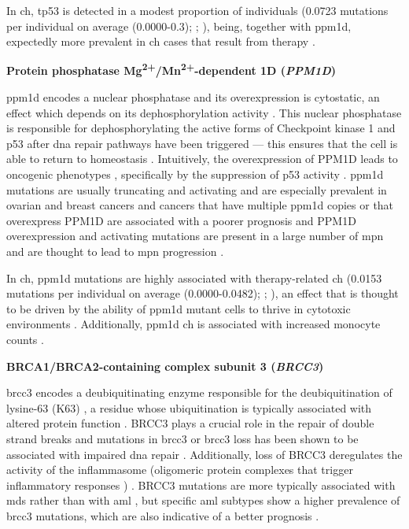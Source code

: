 In \ac{ch}, \ac{tp53} is detected in a modest proportion of individuals \cite{Jaiswal2014-rl,Genovese2014-eu,Zink2017-zi,Bolton2020-ct,Coombs2017-ph,McKerrell2015-rl,Acuna-Hidalgo2017-ng,Desai2018-pj,Young2016-du,Young2019-rz} (0.0723 mutations per individual on average (0.0000-0.3); ; ), being, together with \ac{ppm1d}, expectedly more prevalent in \ac{ch} cases that result from therapy \cite{Zehir2017-gh}.

\noindent \textbf{Protein phosphatase Mg\textsuperscript{2+}/Mn\textsuperscript{2+}-dependent 1D (\textit{PPM1D})}

\Ac{ppm1d} encodes a nuclear phosphatase and its overexpression is cytostatic, an effect which depends on its dephosphorylation activity \cite{Fiscella1997-ay}. This nuclear phosphatase is responsible for dephosphorylating the active forms of Checkpoint kinase 1 and p53 after \ac{dna} repair pathways have been triggered --- this ensures that the cell is able to return to homeostasis \cite{Lu2005-it}. Intuitively, the overexpression of PPM1D leads to oncogenic phenotypes \cite{Li2002-dl}, specifically by the suppression of p53 activity \cite{Bulavin2002-ft}. \ac{ppm1d} mutations are usually truncating and activating and are especially prevalent in ovarian and breast cancers \cite{Bolton2020-ct} and cancers that have multiple \ac{ppm1d} copies or that overexpress PPM1D are associated with a poorer prognosis \cite{Lambros2010-yo,Castellino2008-wr,Yang2015-kz} and PPM1D overexpression and activating mutations are present in a large number of \ac{mpn} and are thought to lead to \ac{mpn} progression \cite{Marcellino2019-ze}. 

In \ac{ch}, \ac{ppm1d} mutations are highly associated with therapy-related \ac{ch} \cite{Genovese2014-eu,Zink2017-zi,Bolton2020-ct,Coombs2017-ph,Desai2018-pj} (0.0153 mutations per individual on average (0.0000-0.0482); ; ), an effect that is thought to be driven by the ability of \ac{ppm1d} mutant cells to thrive in cytotoxic environments \cite{Hsu2018-ta}. Additionally, \ac{ppm1d} \ac{ch} is associated with increased monocyte counts \cite{Dawoud2020-af}.

\noindent \textbf{BRCA1/BRCA2-containing complex subunit 3 (\textit{BRCC3})}

\ac{brcc3} encodes a deubiquitinating enzyme responsible for the deubiquitination of lysine-63 (K63) \cite{Dong2003-ei}, a residue whose ubiquitination is typically associated with altered protein function \cite{Meyer2020-yq}. BRCC3 plays a crucial role in the repair of double strand breaks and mutations in \ac{brcc3} or \ac{brcc3} loss has been shown to be associated with impaired \ac{dna} repair \cite{Chen2006-ub}. Additionally, loss of BRCC3 deregulates the activity of the inflammasome (oligomeric protein complexes that trigger inflammatory responses \cite{Broz2016-zn}) \cite{Py2013-wr}. BRCC3 mutations are more typically associated with \ac{mds} \cite{Huang2015-id} rather than with \ac{aml} \cite{noauthor_2013-ti}, but specific \ac{aml} subtypes show a higher prevalence of \ac{brcc3} mutations, which are also indicative of a better prognosis \cite{Jahn2017-dh,Meyer2020-yq}.


